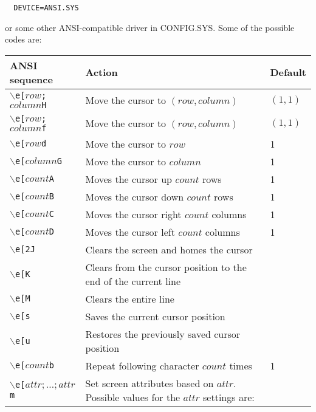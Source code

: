 \verb|  |{\tt DEVICE=ANSI.SYS}

or some other ANSI-compatible driver in CONFIG.SYS.  Some of the possible codes
are:

\begin{center}
\begin{tabular}{|l|p{215.4pt}|l|}
\hline
  ANSI sequence   & Action                                    & Default\\
\hline
  $\backslash${\tt e[$row$;$column$H} & Move the cursor to $(row, column)$        & $(1,1)$\\
  $\backslash${\tt e[$row$;$column$f} & Move the cursor to $(row, column)$        & $(1,1)$\\
  $\backslash${\tt e[$row$d}          & Move the cursor to $row$                  & 1\\
  $\backslash${\tt e[$column$G}       & Move the cursor to $column$               & 1\\
  $\backslash${\tt e[$count$A}        & Moves the cursor up $count$ rows          & 1\\
  $\backslash${\tt e[$count$B}        & Moves the cursor down $count$ rows        & 1\\
  $\backslash${\tt e[$count$C}        & Moves the cursor right $count$ columns    & 1\\
  $\backslash${\tt e[$count$D}        & Moves the cursor left $count$ columns     & 1\\
  $\backslash${\tt e[2J}           & Clears the screen and homes the cursor & \\
  $\backslash${\tt e[K}            & Clears from the cursor position to the
                                     end of the current line & \\
  $\backslash${\tt e[M}            & Clears the entire line & \\
  $\backslash${\tt e[s}            & Saves the current cursor position & \\
  $\backslash${\tt e[u}            & Restores the previously saved cursor
                                     position & \\
  $\backslash${\tt e[$count$b}     & Repeat following character $count$ times  & 1\\
  $\backslash${\tt e[$attr;\dots;attr$m} & Set screen attributes based on $attr$.
                    Possible values for the $attr$ settings
                    are:


\end{tabular}
\end{center}
